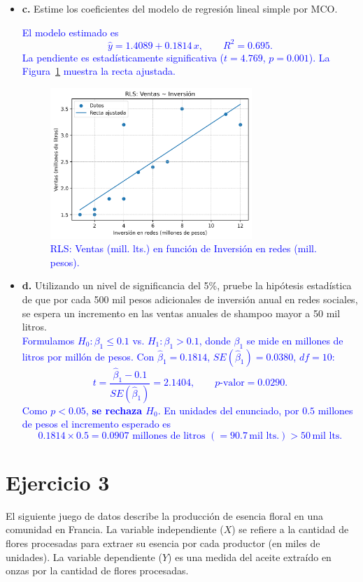 \documentclass[10pt]{article}
\begin{document}
\begin{itemize}
    \item \textbf{c.} Estime los coeficientes del modelo de regresión lineal simple por MCO.\\
\textcolor{blue}{
El modelo estimado es
\[ \hat{y} = 1.4089 + 0.1814\,x, \qquad R^2 = 0.695. \]
La pendiente es estadísticamente significativa ($t=4.769$, $p=0.001$). La Figura~\ref{fig:sh_line} muestra la recta ajustada.
\begin{figure}[H]
    \centering
    \includegraphics[width=0.72\textwidth]{../plots/python/ejercicio2/shampoo_rls_line.png}
    \caption{RLS: Ventas (mill. lts.) en función de Inversión en redes (mill. pesos).}
    \label{fig:sh_line}
\end{figure}
}

    \item \textbf{d.} Utilizando un nivel de significancia del 5\%, pruebe la hipótesis estadística de que por cada 500 mil pesos adicionales de inversión anual en redes sociales, se espera un incremento en las ventas anuales de shampoo mayor a 50 mil litros.\\
\textcolor{blue}{
Formulamos $H_0: \beta_1 \le 0.1$ vs. $H_1: \beta_1 > 0.1$, donde $\beta_1$ se mide en millones de litros por millón de pesos. Con $\hat{\beta}_1=0.1814$, $SE(\hat{\beta}_1)=0.0380$, $df=10$:
\[ t = \frac{\hat{\beta}_1 - 0.1}{SE(\hat{\beta}_1)} = 2.1404, \qquad p\text{-valor}=0.0290. \]
Como $p<0.05$, \textbf{se rechaza $H_0$}. En unidades del enunciado, por $0.5$ millones de pesos el incremento esperado es
\[ 0.1814\times 0.5 = 0.0907 \text{ millones de litros } (= 90.7\,\text{mil lts.}) > 50\,\text{mil lts.} \]
}
\end{itemize}

\section{Ejercicio 3}
El siguiente juego de datos describe la producción de esencia floral en una comunidad en Francia. La variable independiente ($X$) se refiere a la cantidad de flores procesadas para extraer su esencia por cada productor (en miles de unidades). La variable dependiente ($Y$) es una medida del aceite extraído en onzas por la cantidad de flores procesadas.
\end{document}
